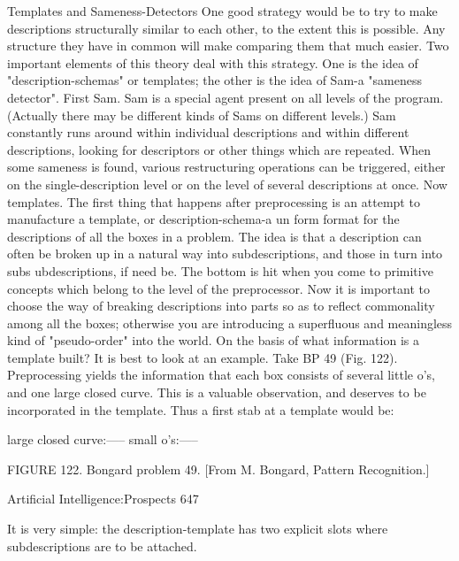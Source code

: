    Templates and Sameness-Detectors
   One good strategy would be to try to make descriptions structurally similar to
   each other, to the extent this is possible. Any structure they have in common will
   make comparing them that much easier. Two important elements of this theory
   deal with this strategy. One is the idea of "description-schemas" or templates; the
   other is the idea of Sam-a "sameness detector".
       First Sam. Sam is a special agent present on all levels of the program.
   (Actually there may be different kinds of Sams on different levels.) Sam
   constantly runs around within individual descriptions and within different
   descriptions, looking for descriptors or other things which are repeated. When
   some sameness is found, various restructuring operations can be triggered, either
   on the single-description level or on the level of several descriptions at once.
   Now templates. The first thing that happens after preprocessing is an attempt to
   manufacture a template, or description-schema-a un form format for the
   descriptions of all the boxes in a problem. The idea is that a description can often
   be broken up in a natural way into subdescriptions, and those in turn into subs
   ubdescriptions, if need be. The bottom is hit when you come to primitive concepts
   which belong to the level of the preprocessor. Now it is important to choose the
   way of breaking descriptions into parts so as to reflect commonality among all the
   boxes; otherwise you are introducing a superfluous and meaningless kind of
   "pseudo-order" into the world.
       On the basis of what information is a template built? It is best to look at an
   example. Take BP 49 (Fig. 122). Preprocessing yields the information that each
   box consists of several little o's, and one large closed curve. This is a valuable
   observation, and deserves to be incorporated in the template. Thus a first stab at a
   template would be:

   large closed curve:-----
   small o's:-----

   FIGURE 122. Bongard problem 49. [From M. Bongard, Pattern Recognition.]




Artificial Intelligence:Prospects                                                     647

   It is very simple: the description-template has two explicit slots where
   subdescriptions are to be attached.

